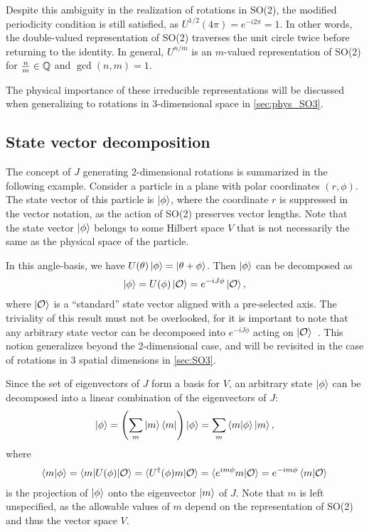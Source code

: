 Despite this ambiguity in the realization of rotations in SO(2), the modified periodicity condition is still satisfied, as $U^{1/2}(4\pi) = e^{-i2\pi} = 1$. In other words, the double-valued representation of SO(2) traverses the unit circle twice before returning to the identity. In general, $U^{n/m}$ is an $m$-valued representation of SO(2) for $\frac{n}{m}\in\mathbb{Q}$ and $\gcd(n,m)=1$.

The physical importance of these irreducible representations will be discussed when generalizing to rotations in 3-dimensional space in \cref{sec:phys_SO3}.

\subsection{State vector decomposition}\label{sub:SO2_decomp}
The concept of $J$ generating 2-dimensional rotations is summarized in the following example. Consider a particle in a plane with polar coordinates $(r,\phi)$. The state vector of this particle is $\ket{\phi}$, where the coordinate $r$ is suppressed in the vector notation, as the action of SO(2) preserves vector lengths. Note that the state vector $\ket{\phi}$ belongs to some Hilbert space $V$ that is not necessarily the same as the physical space of the particle.

In this angle-basis, we have $U(\theta)\ket{\phi} = \ket{\theta+\phi}$. Then $\ket{\phi}$ can be decomposed as
\begin{align*}
    \ket{\phi} = U(\phi)\ket{\mathcal{O}} = e^{-iJ\phi}\ket{\mathcal{O}},
\end{align*}
where $\ket{\mathcal{O}}$ is a ``standard'' state vector aligned with a pre-selected axis. The triviality of this result must not be overlooked, for it is important to note that any arbitrary state vector can be decomposed into $e^{-iJ\phi}$ acting on $\ket{\mathcal{O}}$~\cite{Tung1985}. This notion generalizes beyond the 2-dimensional case, and will be revisited in the case of rotations in 3 spatial dimensions in \cref{sec:SO3}.

Since the set of eigenvectors of $J$ form a basis for $V$, an arbitrary state $\ket{\phi}$ can be decomposed into a linear combination of the eigenvectors of $J$:
\begin{align*}
    \ket{\phi} = \left( \sum_{m} \ket{m}\bra{m} \right)\ket{\phi} = \sum_{m} \braket{m|\phi}\ket{m},
\end{align*}
where
\begin{align*}
    \braket{m|\phi} = \braket{m|U(\phi)|\mathcal{O}} = \braket{U^\dagger(\phi)m|\mathcal{O}} = \braket{e^{im\phi}m|\mathcal{O}} = e^{-im\phi}\braket{m|\mathcal{O}}
\end{align*}
is the projection of $\ket{\phi}$ onto the eigenvector $\ket{m}$ of $J$. Note that $m$ is left unspecified, as the allowable values of $m$ depend on the representation of SO(2) and thus the vector space $V$.

